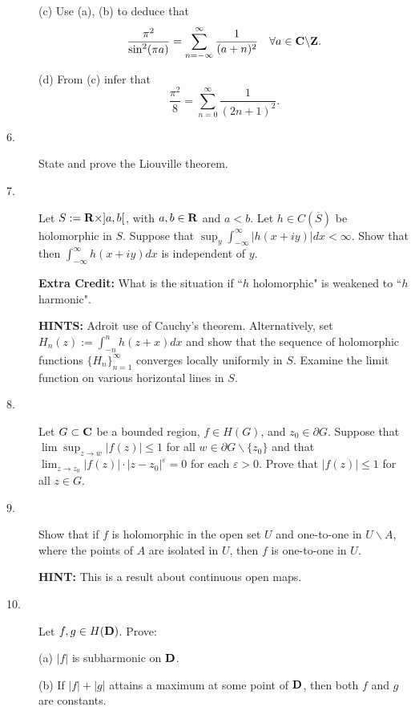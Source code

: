 \documentclass{article}
\begin{document}
\begin{description}
\item[\quad] (c)
Use (a), (b) to deduce that
$$\frac{\pi^2}{\sin^2 (\pi a)} = \sum^\infty_{n = -\infty}
  \frac{1}{(a + n)^2} \quad \forall a \in {\bf C} \backslash {\bf Z}.$$

\item[\quad] (d)
From (c) infer that
$$\frac{\pi^2}{8} = \sum^\infty_{n=0} \frac{1}{(2n + 1)^2}.$$

\item[6.]
State and prove the Liouville theorem.

\item[7.]
Let $S := {\bf R} \times ]a,b[$, with $a,b \in {\bf R}$ and $a<b$. Let
$h \in C(\overline S)$ be holomorphic in $S$. Suppose that
$\sup_y \int^\infty_{-\infty} |h(x+ iy)| dx < \infty$. Show that then
$\int^\infty_{-\infty} h(x+iy) dx$ is independent of $y$.

{\bf Extra Credit:} What is the situation if ``$h$ holomorphic" is weakened
to ``$h$ harmonic".

{\bf HINTS:} Adroit use of Cauchy's theorem. Alternatively, set
$H_n(z) := \int^n_{-n} h(z+ x) dx$ and show that the sequence of holomorphic
functions $\{H_n\}^\infty_{n=1}$ converges locally uniformly in $S$.
Examine the limit function on various horizontal lines in $S$.

\item[8.]
Let  $G \subset {\bf C}$ be a bounded region, $f \in H(G)$, and $z_0 \in \partial G$.
Suppose that $\lim \sup_{z \to w} |f(z)| \leq 1$ for all
$w \in \partial G \backslash \{z_0\}$ and that
$\lim_{z \to z_0} |f(z)| \cdot |z - z_0|^\varepsilon = 0$
for each $\varepsilon > 0$. Prove that $|f(z)| \leq 1$ for all $z \in G$.

\item[9.]
Show that if $f$ is holomorphic in the open set $U$ and one-to-one in
$U \backslash A$, where the points of $A$ are isolated in $U$, then
$f$ is one-to-one in $U$.

{\bf HINT:} This is a result about continuous open maps.

\item[10.]
Let $f, g \in H({\bf D})$. Prove:

\item[\quad] (a)
$|f|$ is subharmonic on ${\bf D}$.

\item[\quad] (b)
If $|f| + |g|$ attains a maximum at some point of ${\bf D}$, then both $f$ and
$g$ are constants.






\end{description}    
\end{document}
